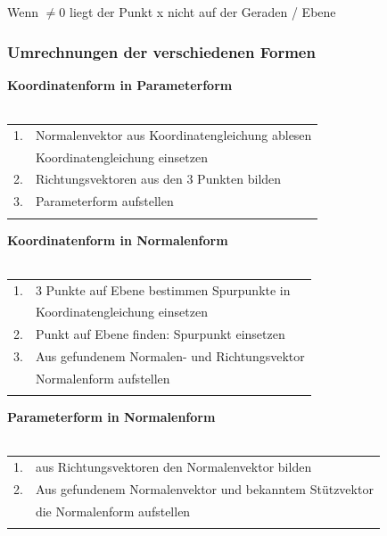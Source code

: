 			Wenn $\neq 0$ liegt der Punkt x nicht auf der Geraden / Ebene 
			
			
		    \subsubsection{Umrechnungen der verschiedenen Formen}
		    \textbf{Koordinatenform in Parameterform}\\
		    \\
		    \begin{tabular}{ll}
		    1. & Normalenvektor aus Koordinatengleichung ablesen \\
		    & Koordinatengleichung einsetzen \\
		    2. & Richtungsvektoren aus den 3 Punkten bilden \\
		    3. & Parameterform aufstellen \\
		    \\
		    \end{tabular}
		    

		    	\textbf{Koordinatenform in Normalenform} \\
		    	\\
		    	\begin{tabular}{ll}
		    1. & 3 Punkte auf Ebene bestimmen  Spurpunkte in \\
		    & Koordinatengleichung einsetzen \\
		    2. & Punkt auf Ebene finden: Spurpunkt einsetzen \\
		    3. & Aus gefundenem Normalen- und Richtungsvektor \\
		    & Normalenform aufstellen \\
		    \\
		    \end{tabular}
		    
		    
			\textbf{Parameterform in Normalenform}\\
		    	\\
		    	\begin{tabular}{ll}
		    1. & aus Richtungsvektoren den Normalenvektor bilden \\
		    2. & Aus gefundenem Normalenvektor und bekanntem Stützvektor \\
		    &  die Normalenform aufstellen \\	   
		    \\
		    \end{tabular}		    
		    
